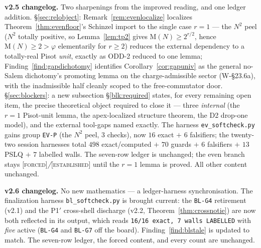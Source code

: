 \documentclass[11pt]{article}
\newcommand{\tagF}{\textcolor{cF}{\textsc{[forced]}}}
\newcommand{\tagE}{\textcolor{cE}{\textsc{[established]}}}
\newcommand{\hx}[1]{\textcolor{cC}{\footnotesize\texttt{#1}}}
\newcommand{\gp}{\varphi}
\newcommand{\M}{\mathrm{M}}
\theoremstyle{plain}
\theoremstyle{definition}
\theoremstyle{remark}
\begin{document}
\smallskip\noindent
\textbf{v2.5 changelog.} Two sharpenings from the improved reading, and one ledger
addition. \S\ref{sec:relobject}: Remark~\ref{rem:evenlocalize} localizes
Theorem~\ref{thm:evenfloor}'s Schinzel import to the single case $r=1$ --- the
$N^2$ peel ($N^2$ totally positive, so Lemma~\ref{lem:tp2} gives
$\M(N)\ge2^{r/2}$, hence $\M(N)\ge2>\gp$ elementarily for $r\ge2$) reduces the
external dependency to a totally-real Pisot \emph{unit}, exactly as ODD-2 reduced
to one lemma; Finding~\ref{find:gapdichotomy} identifies
Corollary~\ref{cor:gapuniv} as the general no-Salem dichotomy's promoting lemma on
the charge-admissible sector (W-\S23.6a), with the inadmissible half cleanly
scoped to the free-commutator door. \S\ref{sec:blockers}: a new subsection
\S\ref{blk:required} states, for every remaining open item, the precise
theoretical object required to close it --- three \emph{internal} (the $r=1$
Pisot-unit lemma, the apex-localized structure theorem, the D2 drop-one model),
and the external tool-gaps named exactly. The harness \texttt{ev\_softcheck.py}
gains group \hx{EV-P} (the $N^2$ peel, $3$ checks), now $16$ exact $+$ $6$
falsifiers; the twenty-two session harnesses total $498$ exact/computed $+$ $70$
guards $+$ $6$ falsifiers $+$ $13$ PSLQ $+$ $7$ labelled walls. The seven-row
ledger is unchanged; the even branch stays \tagF{}\emph{/}\tagE{} until the $r=1$
lemma is proved. All other content unchanged.

\smallskip\noindent
\textbf{v2.6 changelog.} No new mathematics --- a ledger-harness synchronisation.
The finalization harness \texttt{bl\_softcheck.py} is brought current: the
\hx{BL-G4} retirement (v2.1) and the P1$'$ cross-shell discharge (v2.2,
Theorem~\ref{thm:crossnotie}) are now both reflected in its output, which reads
\texttt{16/16 exact, 7 walls LABELLED} with \emph{five} active (\hx{BL-G4} and
\hx{BL-G7} off the board). Finding~\ref{find:blstale} is updated to match. The
seven-row ledger, the forced content, and every count are unchanged.
\end{document}
